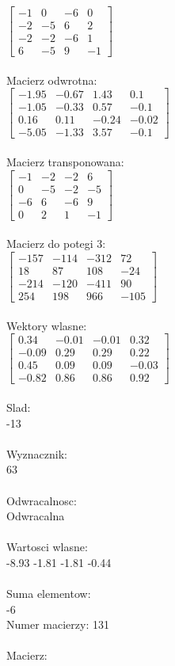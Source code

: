 \documentclass[a4paper,12pt]{article}
\begin{document}
$\begin{bmatrix} -1&0&-6&0\\-2&-5&6&2\\-2&-2&-6&1\\6&-5&9&-1 \end{bmatrix}$
\\
\\
Macierz odwrotna:\\

$\begin{bmatrix} -1.95&-0.67&1.43&0.1\\-1.05&-0.33&0.57&-0.1\\0.16&0.11&-0.24&-0.02\\-5.05&-1.33&3.57&-0.1 \end{bmatrix}$
\\
\\
Macierz transponowana:\\

$\begin{bmatrix} -1&-2&-2&6\\0&-5&-2&-5\\-6&6&-6&9\\0&2&1&-1 \end{bmatrix}$
\\
\\
Macierz do potegi 3:\\

$\begin{bmatrix} -157&-114&-312&72\\18&87&108&-24\\-214&-120&-411&90\\254&198&966&-105 \end{bmatrix}$
\\
\\
Wektory wlasne:\\

$\begin{bmatrix} 0.34&-0.01&-0.01&0.32\\-0.09&0.29&0.29&0.22\\0.45&0.09&0.09&-0.03\\-0.82&0.86&0.86&0.92 \end{bmatrix}$
\\
\\
Slad:\\
-13
\\
\\
Wyznacznik:\\
63
\\
\\
Odwracalnosc:\\
Odwracalna
\\
\\
Wartosci wlasne:\\
-8.93 -1.81 -1.81 -0.44
\\
\\
Suma elementow:\\
-6
\\
\newpage
Numer macierzy:
131
\\
\\
Macierz:\\
\end{document}

